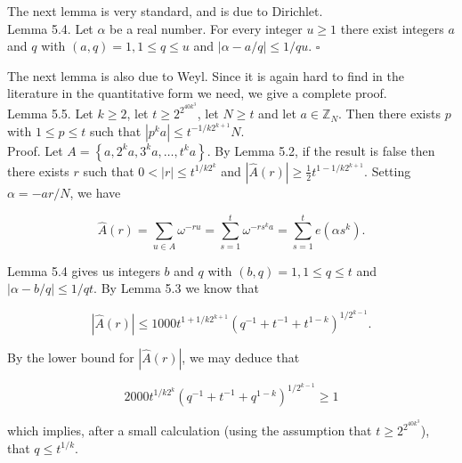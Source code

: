 \documentclass[10pt]{article}
\begin{document}
The next lemma is very standard, and is due to Dirichlet.\\
Lemma 5.4. Let $\alpha$ be a real number. For every integer $u \geqslant 1$ there exist integers $a$ and $q$ with $(a, q)=1,1 \leqslant q \leqslant u$ and $|\alpha-a / q| \leqslant 1 / q u$. \(\square\)

The next lemma is also due to Weyl. Since it is again hard to find in the literature in the quantitative form we need, we give a complete proof.\\
Lemma 5.5. Let $k \geqslant 2$, let $t \geqslant 2^{2^{40 k^{3}}}$, let $N \geqslant t$ and let $a \in \mathbb{Z}_{N}$. Then there exists $p$ with $1\leqslant p \leqslant t$ such that $\left|p^{k} a\right| \leqslant t^{-1 / k 2^{k+1}} N$.\\
Proof. Let $A=\left\{a, 2^{k} a, 3^{k} a, \ldots, t^{k} a\right\}$. By Lemma 5.2, if the result is false then there exists $r$ such that $0<|r| \leqslant t^{1 / k 2^{k}}$ and $|\hat{A}(r)| \geqslant \frac{1}{2} t^{1-1 / k 2^{k+1}}$. Setting $\alpha=-a r / N$, we have

$$
\hat{A}(r)=\sum_{u \in A} \omega^{-r u}=\sum_{s=1}^{t} \omega^{-r s^{k} a}=\sum_{s=1}^{t} e\left(\alpha s^{k}\right) .
$$

Lemma 5.4 gives us integers $b$ and $q$ with $(b, q)=1,1 \leqslant q \leqslant t$ and $|\alpha-b / q| \leqslant 1 / q t$. By Lemma 5.3 we know that

$$
|\hat{A}(r)| \leqslant 1000 t^{1+1 / k 2^{k+1}}\left(q^{-1}+t^{-1}+t^{1-k}\right)^{1 / 2^{k-1}} .
$$

By the lower bound for $|\hat{A}(r)|$, we may deduce that

$$
2000 t^{1 / k 2^{k}}\left(q^{-1}+t^{-1}+q^{1-k}\right)^{1 / 2^{k-1}} \geqslant 1
$$

which implies, after a small calculation (using the assumption that $t \geqslant 2^{2^{40 k^{3}}}$), that $q \leqslant t^{1/k}$.
\end{document}
